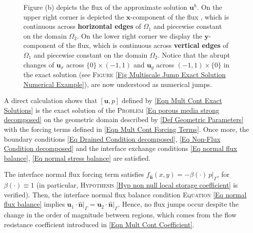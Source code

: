 \documentclass[3p]{elsarticle}
\def\n{\bm{\widehat{ n} } }
\def\u{\mathbf u}
\def\uone{\mathbf{u}_{1}}
\def\utwo{\mathbf{u}_{2}}
\def\flux{f_{\bm{\hat{n}} } }
\def\iversor{\widehat{\boldsymbol{\imath} } }
\def\jversor{\widehat{\boldsymbol{\jmath} } }
\begin{document}
\begin{example}
\begin{figure}[h]
{	Figure (b) depicts the flux of the approximate solution $\u^{h}$. On the upper right corner is depicted the $\boldsymbol{x}$-component of the flux %
	, which is continuous across \textbf{horizontal edges} of $\Omega_{1}$ and piecewise constant on the domain $\Omega_2$.	
	On the lower right corner we display %
	the $\boldsymbol{y}$-component of the flux, which is continuous across \textbf{vertical edges} of $\Omega_{1}$ and piecewise constant on the domain $\Omega_2$. Notice that the abrupt changes of $ \u_{x} $ across $ \{0\}\times (-1,1) $ and $ \u_{y} $ across $ (-1,1)\times\{0\} $ 
	in the exact solution (see \textsc{Figure} \ref{Fig Multiscale Jump Exact Solution Numerical Example}), are now understood as numerical jumps. \label{Fig Multiscale Jump Approximate Solution Numerical Example} }
\end{figure}
%
%
A direct calculation shows that $[\u, p]$ defined by \eqref{Eqn Mult Cont Exact Solutions}
is the exact solution of the \textsc{Problem} \eqref{Eq porous media strong decomposed} on the geometric domain described by \eqref{Def Geometric Parameters} with the forcing terms defined in \eqref{Eqn Mult Cont Forcing Terms}. Once more, the boundary conditions \eqref{Eq Drained Condition decomposed}, \eqref{Eq Non-Flux Condition decomposed} and the interface exchange conditions \eqref{Eq normal flux balance}, \eqref{Eq normal stress balance} are satisfied. 

The interface normal flux forcing term satisfies $ \flux (x,y)  = - \beta(\cdot)\, p\big\vert_{\Gamma} $, for $ \beta(\cdot) \equiv 1 $ (in particular, \textsc{Hypothesis} \ref{Hyp non null local storage coefficient} is verified). Then, the interface normal flux balance condition \textsc{Equation} \eqref{Eq normal flux balance} implies $ \uone\cdot\n\big\vert_{\Gamma} = \utwo\cdot\n\big\vert_{\Gamma} $. Hence, no flux jumps occur despite the change in the order of magnitude between regions, which comes from the flow resistance coefficient introduced in  \eqref{Eqn Mult Cont Coefficient}. 


\end{example}
\end{document}
